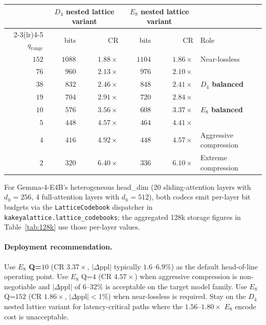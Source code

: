 \documentclass[10pt,a4paper]{article}
\theoremstyle{definition}
\theoremstyle{plain}
\begin{document}
\begin{center}
\begin{tabular}{rrrrrl}
  \toprule
   & \multicolumn{2}{c}{$D_4$ nested lattice variant} & \multicolumn{2}{c}{$E_8$ nested lattice variant} & \\
  \cmidrule(lr){2-3}\cmidrule(lr){4-5}
  $q_\mathrm{range}$ & bits & CR & bits & CR & Role \\
  \midrule
  $152$ & $1088$ & $1.88\times$ & $1104$ & $1.86\times$ & Near-lossless \\
  $\phantom{0}76$ & $\phantom{0}960$ & $2.13\times$ & $\phantom{0}976$ & $2.10\times$ & \\
  $\phantom{0}38$ & $\phantom{0}832$ & $2.46\times$ & $\phantom{0}848$ & $2.41\times$ & \textbf{$D_4$ balanced} \\
  $\phantom{0}19$ & $\phantom{0}704$ & $2.91\times$ & $\phantom{0}720$ & $2.84\times$ & \\
  $\phantom{0}10$ & $\phantom{0}576$ & $3.56\times$ & $\phantom{0}608$ & $3.37\times$ & \textbf{$E_8$ balanced} \\
  $\phantom{00}5$ & $\phantom{0}448$ & $4.57\times$ & $\phantom{0}464$ & $4.41\times$ & \\
  $\phantom{00}4$ & $\phantom{0}416$ & $4.92\times$ & $\phantom{0}448$ & $4.57\times$ & Aggressive compression \\
  $\phantom{00}2$ & $\phantom{0}320$ & $6.40\times$ & $\phantom{0}336$ & $6.10\times$ & Extreme compression \\
  \bottomrule
\end{tabular}
\end{center}

For Gemma-4-E4B's heterogeneous head\_dim (20 sliding-attention
layers with $d_h = 256$, 4 full-attention layers with $d_h = 512$),
both codecs emit per-layer bit budgets via the
\texttt{LatticeCodebook} dispatcher in
\texttt{kakeyalattice.lattice\_codebooks}; the aggregated 128k
storage figures in Table~\ref{tab:128k} use those per-layer values.

\paragraph{Deployment recommendation.} Use
\textbf{$E_8$ Q=$10$} (CR $3.37\times$, $|\Delta\mathrm{ppl}|$
typically $1.6$--$6.9\%$) as the default head-of-line operating
point. Use $E_8$ Q=$4$ (CR $4.57\times$) when aggressive compression
is non-negotiable and $|\Delta\mathrm{ppl}|$ of $6$--$32\%$ is
acceptable on the target model family. Use $E_8$ Q=$152$
(CR $1.86\times$, $|\Delta\mathrm{ppl}| < 1\%$) when near-lossless
is required. Stay on the $D_4$ nested lattice variant for latency-critical
paths where the $1.56$--$1.80\times$ $E_8$ encode cost is
unacceptable.
\end{document}
